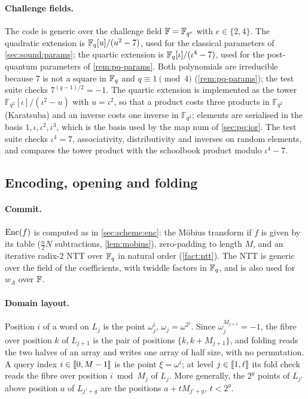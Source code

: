 \paragraph{Challenge fields.}
The code is generic over the challenge field $\mathbb{F} = \mathbb{F}_{q^e}$ with $e \in \{2, 4\}$.
The quadratic extension is $\mathbb{F}_q[u]/(u^2 - 7)$, used for the classical parameters of \cref{sec:sound:params}; the quartic extension is $\mathbb{F}_q[\iota]/(\iota^4 - 7)$, used for the post-quantum parameters of \cref{rem:pq-params}.
Both polynomials are irreducible because $7$ is not a square in $\mathbb{F}_q$ and $q \equiv 1 \pmod 4$ (\cref{rem:pq-params}); the test suite checks $7^{(q-1)/2} = -1$.
The quartic extension is implemented as the tower $\mathbb{F}_{q^2}[\iota]/(\iota^2 - u)$ with $u = \iota^2$, so that a product costs three products in $\mathbb{F}_{q^2}$ (Karatsuba) and an inverse costs one inverse in $\mathbb{F}_{q^2}$; elements are serialised in the basis $1, \iota, \iota^2, \iota^3$, which is the basis used by the map $\mathrm{num}$ of \cref{sec:pq:ior}.
The test suite checks $\iota^4 = 7$, associativity, distributivity and inverses on random elements, and compares the tower product with the schoolbook product modulo $\iota^4 - 7$.

\subsection{Encoding, opening and folding}\label{sec:impl:alg}

\paragraph{Commit.}
$\mathrm{Enc}(f)$ is computed as in \cref{sec:scheme:enc}: the M\"obius transform if $f$ is given by its table ($\tfrac n2 N$ subtractions, \cref{lem:mobius}), zero-padding to length $M$, and an iterative radix-$2$ NTT over $\mathbb{F}_q$ in natural order (\cref{fact:ntt}).
The NTT is generic over the field of the coefficients, with twiddle factors in $\mathbb{F}_q$, and is also used for $w_A$ over $\mathbb{F}$.

\paragraph{Domain layout.}
Position $i$ of a word on $L_j$ is the point $\omega_j^i$, $\omega_j = \omega^{2^j}$.
Since $\omega_j^{M_{j+1}} = -1$, the fibre over position $k$ of $L_{j+1}$ is the pair of positions $\{k, k + M_{j+1}\}$, and folding reads the two halves of an array and writes one array of half size, with no permutation.
A query index $i \in \llbracket 0, M-1 \rrbracket$ is the point $\xi = \omega^i$; at level $j \in \llbracket 1, \ell \rrbracket$ its fold check reads the fibre over position $i \bmod M_j$ of $L_j$. More generally, the $2^g$ points of $L_{j'}$ above position $a$ of $L_{j'+g}$ are the positions $a + t M_{j'+g}$, $t < 2^g$.

